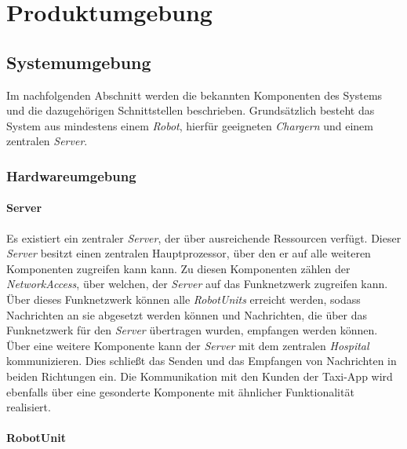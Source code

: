 \section{Produktumgebung}

  \subsection{Systemumgebung}
  Im nachfolgenden Abschnitt werden die bekannten Komponenten des Systems
  und die dazugehörigen Schnittstellen beschrieben. 
  Grundsätzlich besteht
  das System aus mindestens einem \emph{Robot}, hierfür geeigneten
  \emph{Chargern} und einem zentralen \emph{Server}.

  \subsubsection{Hardwareumgebung}

  \paragraph{Server}\label{server}

  Es existiert ein zentraler \emph{Server}, der über ausreichende Ressourcen verfügt. 
  Dieser \emph{Server} besitzt einen zentralen Hauptprozessor, über den er auf alle weiteren Komponenten zugreifen kann kann. 
  Zu diesen Komponenten zählen der \emph{NetworkAccess}, über welchen, der \emph{Server} auf das Funknetzwerk zugreifen kann. 
  Über dieses Funknetzwerk können alle \emph{RobotUnits} erreicht werden, sodass Nachrichten an sie abgesetzt werden können und Nachrichten, die über das Funknetzwerk für den \emph{Server} übertragen wurden, empfangen werden können. 
  Über eine weitere Komponente kann der \emph{Server} mit dem zentralen \emph{Hospital} kommunizieren. 
  Dies schließt das Senden und das Empfangen von Nachrichten in beiden Richtungen ein. 
  Die Kommunikation mit den Kunden der Taxi-App wird ebenfalls über eine gesonderte Komponente mit ähnlicher Funktionalität realisiert.

  \paragraph{RobotUnit}\label{robotunit}

